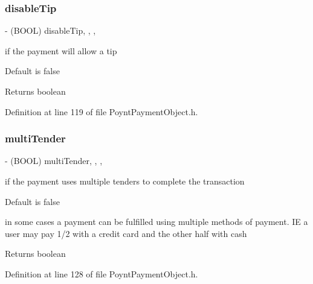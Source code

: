 \subsubsection{\texorpdfstring{disable\+Tip}{disableTip}}
{\footnotesize\ttfamily -\/ (B\+O\+OL) disable\+Tip\hspace{0.3cm}{\ttfamily [read]}, {\ttfamily [write]}, {\ttfamily [nonatomic]}, {\ttfamily [assign]}}



if the payment will allow a tip 

Default is false

\begin{DoxyReturn}{Returns}
boolean 
\end{DoxyReturn}


Definition at line 119 of file Poynt\+Payment\+Object.\+h.

\hypertarget{interface_poynt_payment_object_a42f2647ecd1d090fad6a7b77e28ee013}{}\label{interface_poynt_payment_object_a42f2647ecd1d090fad6a7b77e28ee013} 
\subsubsection{\texorpdfstring{multi\+Tender}{multiTender}}
{\footnotesize\ttfamily -\/ (B\+O\+OL) multi\+Tender\hspace{0.3cm}{\ttfamily [read]}, {\ttfamily [write]}, {\ttfamily [nonatomic]}, {\ttfamily [assign]}}



if the payment uses multiple tenders to complete the transaction 

Default is false

in some cases a payment can be fulfilled using multiple methods of payment. IE a user may pay 1/2 with a credit card and the other half with cash \begin{DoxyReturn}{Returns}
boolean 
\end{DoxyReturn}


Definition at line 128 of file Poynt\+Payment\+Object.\+h.

\hypertarget{interface_poynt_payment_object_a84b5ff3701d66e70a3bb2485d4e99a3b}{}\label{interface_poynt_payment_object_a84b5ff3701d66e70a3bb2485d4e99a3b} 
